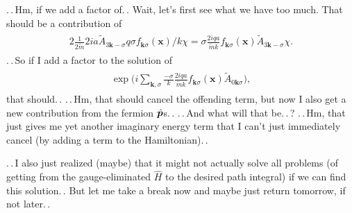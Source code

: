 \documentclass{report}
\newcommand{\bsacc}[3]{#1{\boldsymbol{#2}\hspace{#3em}}\hspace{-#3em}}
\newcommand{\hatbsp}{{\bsacc{\hat}{p}{.15}}}
\begin{document}
.\,.\,Hm, if we add a factor of.\,. Wait, let's first see what we have too much. That should be a contribution of
\begin{align}
\begin{aligned}
	2\frac{1}{2\tilde m}  
	2ia \tilde A_{3\boldsymbol{k}-\sigma}
	q \sigma f_{\boldsymbol{k}\sigma}(\boldsymbol{x}) / k
	\chi = 
	\sigma
	\frac{2i q a}{\tilde m k}  
	f_{\boldsymbol{k}\sigma}(\boldsymbol{x})
	\tilde A_{3\boldsymbol{k}-\sigma}
	\chi.
\end{aligned}
\end{align}
.\,.\,So if I add a factor to the solution of 
\begin{align}
\begin{aligned}
	\exp\Big(
		i\sum_{\boldsymbol{k}, \sigma} 
		\frac{-\sigma}{k}
		\frac{2i q a}{\tilde m k}  
		f_{\boldsymbol{k}\sigma}(\boldsymbol{x})
		\tilde A_{0\boldsymbol{k}\sigma} 
	\Big),
	\label{3.23}
\end{aligned}
\end{align}
that should.\,. .\,.\,Hm, that should cancel the offending term, but now I also get a new contribution from the fermion $\hatbsp$s.\,. .\,.\,And what will that be.\,.\,? .\,.\,Hm, that just gives me yet another imaginary energy term that I can't just immediately cancel (by adding a term to the Hamiltonian).\,. %

.\,.\,I also just realized (maybe) that it might not actually solve all problems (of getting from the gauge-eliminated $\hat H$ to the desired path integral) if we can find this solution.\,. But let me take a break now %
and maybe just return tomorrow, if not later.\,. 
\end{document}
